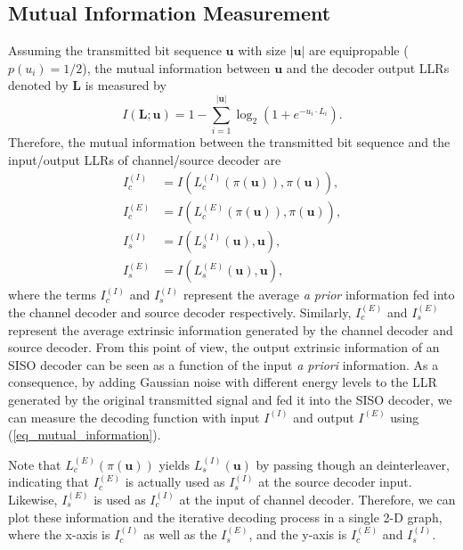 \documentclass[10pt,twocolumn,twoside]{IEEEtran}
\begin{document}
\subsection{Mutual Information Measurement}
Assuming the transmitted bit sequence $\mathbf{u}$ with size ${|\mathbf{u}|}$ are equipropable ($p(u_i) = 1/2$), the mutual information between $\mathbf{u}$ and the decoder output LLRs denoted by $\mathbf{L}$ is measured by
\begin{equation}
I(\mathbf{L};\mathbf{u}) = 1 - \sum_{i=1}^{{|\mathbf{u}|}}\log_2(1+e^{-u_i\cdot L_i}).
\label{eq_mutual_information}
\end{equation}
Therefore, the mutual information between the transmitted bit sequence and the input/output LLRs of channel/source decoder are 
\begin{align}
I_c^{(I)} &= I(L_c^{(I)}(\pi(\mathbf{u})),\pi(\mathbf{u})),\\
I_c^{(E)} &= I(L_c^{(E)}(\pi(\mathbf{u})),\pi(\mathbf{u})),\\
I_s^{(I)} &= I(L_s^{(I)}(\mathbf{u}),\mathbf{u}),\\
I_s^{(E)} &= I(L_s^{(E)}(\mathbf{u}),\mathbf{u}),
\end{align}
where the terms $I_c^{(I)}$ and $I_s^{(I)}$ represent the average {\it a prior} information fed into the channel decoder and source decoder respectively. Similarly, $I_c^{(E)}$ and $I_s^{(E)}$ represent the average extrinsic information generated by the channel decoder and source decoder. From this point of view, the output extrinsic information of an SISO decoder can be seen as a function of the input {\it a priori} information. As a consequence, by adding Gaussian noise with different energy levels to the LLR generated by the original transmitted signal and fed it into the SISO decoder, we can measure the decoding function with input $I^{(I)}$ and output $I^{(E)}$ using (\ref{eq_mutual_information}).

Note that $L_c^{(E)}(\pi(\mathbf{u}))$ yields $L_s^{(I)}(\mathbf{u})$ by passing though an deinterleaver, indicating that $I_c^{(E)}$ is actually used as $I_s^{(I)}$ at the source decoder input. Likewise, $I_s^{(E)}$ is used as $I_c^{(I)}$ at the input of channel decoder. Therefore, we can plot these information and the iterative decoding process in a single 2-D graph, where the x-axis is $I_c^{(I)}$ as well as the $I_s^{(E)}$, and the y-axis is $I_c^{(E)}$ and $I_s^{(I)}$. 
\end{document}
